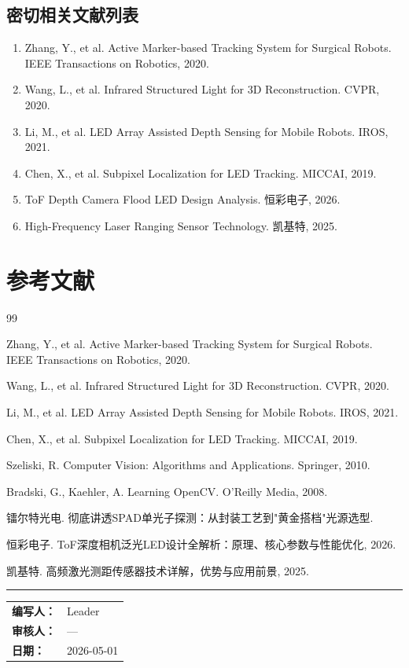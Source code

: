 \documentclass[12pt, a4paper]{ctexart}
\begin{document}
\subsection{密切相关文献列表}

\begin{enumerate}
\item Zhang, Y., et al. Active Marker-based Tracking System for Surgical Robots. IEEE Transactions on Robotics, 2020.
\item Wang, L., et al. Infrared Structured Light for 3D Reconstruction. CVPR, 2020.
\item Li, M., et al. LED Array Assisted Depth Sensing for Mobile Robots. IROS, 2021.
\item Chen, X., et al. Subpixel Localization for LED Tracking. MICCAI, 2019.
\item ToF Depth Camera Flood LED Design Analysis. 恒彩电子, 2026.
\item High-Frequency Laser Ranging Sensor Technology. 凯基特, 2025.
\end{enumerate}

\section*{参考文献}

\begin{thebibliography}{99}
\small
\item Zhang, Y., et al. Active Marker-based Tracking System for Surgical Robots. IEEE Transactions on Robotics, 2020.
\item Wang, L., et al. Infrared Structured Light for 3D Reconstruction. CVPR, 2020.
\item Li, M., et al. LED Array Assisted Depth Sensing for Mobile Robots. IROS, 2021.
\item Chen, X., et al. Subpixel Localization for LED Tracking. MICCAI, 2019.
\item Szeliski, R. Computer Vision: Algorithms and Applications. Springer, 2010.
\item Bradski, G., Kaehler, A. Learning OpenCV. O'Reilly Media, 2008.
\item 镭尔特光电. 彻底讲透SPAD单光子探测：从封装工艺到"黄金搭档"光源选型.
\item 恒彩电子. ToF深度相机泛光LED设计全解析：原理、核心参数与性能优化, 2026.
\item 凯基特. 高频激光测距传感器技术详解，优势与应用前景, 2025.
\end{thebibliography}

\bigskip
\hrule
\bigskip

\begin{center}
\begin{tabular}{ll}
\textbf{编写人：} & Leader \\
\textbf{审核人：} & --- \\
\textbf{日期：} & 2026-05-01 \\
\end{tabular}
\end{center}
\end{document}
